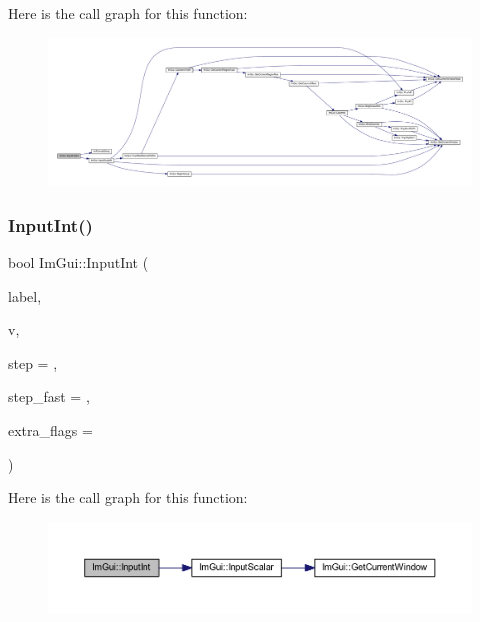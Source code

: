 Here is the call graph for this function\+:
\nopagebreak
\begin{figure}[H]
\begin{center}
\leavevmode
\includegraphics[width=350pt]{namespace_im_gui_aba9f9d8922403f96ca246c65e4929198_cgraph}
\end{center}
\end{figure}
\mbox{\label{namespace_im_gui_a8b5e9de08c18d6053d2f718b99be94a6}} 
\subsubsection{\texorpdfstring{Input\+Int()}{InputInt()}}
{\footnotesize\ttfamily bool Im\+Gui\+::\+Input\+Int (\begin{DoxyParamCaption}\item[{const char $\ast$}]{label,  }\item[{int $\ast$}]{v,  }\item[{int}]{step = {},  }\item[{int}]{step\+\_\+fast = {},  }\item[{\mbox{\hyperlink{imgui_8h_a7d2c6153a6b9b5d3178ce82434ac9fb8}{Im\+Gui\+Input\+Text\+Flags}}}]{extra\+\_\+flags = {} }\end{DoxyParamCaption})}

Here is the call graph for this function\+:
\nopagebreak
\begin{figure}[H]
\begin{center}
\leavevmode
\includegraphics[width=350pt]{namespace_im_gui_a8b5e9de08c18d6053d2f718b99be94a6_cgraph}
\end{center}
\end{figure}
\mbox{\label{namespace_im_gui_a4142cc4545d789d76d51dee61c959a03}} 
